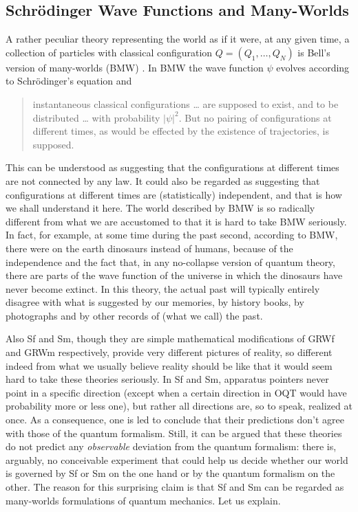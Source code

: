 \documentclass[12pt]{article}
\begin{document}
\subsection{Schr\"odinger Wave Functions  and Many-Worlds}
\label{subsec:swamw}

A rather peculiar theory representing the world as if it were, at any given
 time, a collection of particles with classical configuration
 $Q=(Q_1,\ldots ,Q_N)$ is Bell's version of many-worlds ({\sf BMW})
 \citep{BellMW}. In {\sf BMW} the wave function $\psi$ evolves according to
  Schr\"odinger's equation and \citep{BellMW}
\begin{quote}
   instantaneous classical configurations \ldots{} are 
  supposed to exist, and to be distributed \ldots{}  with probability $|\psi|^2$.
  But no pairing of configurations at different times, as would be 
  effected by the existence of trajectories, is supposed.
\end{quote}
This can be understood as suggesting that the configurations at different times are not connected by any law. It could also be regarded as suggesting that configurations at different times are (statistically) independent, and that is how we shall understand it here.  
The world described by {\sf BMW} is so radically different from what we are accustomed to that it is hard to take {\sf BMW} seriously. In fact, for example, at some time during the past second, according to {\sf BMW}, there were on the earth dinosaurs instead of humans, because of the independence and the fact that, in any no-collapse version of quantum theory, there are parts of the wave function of the universe in which the dinosaurs have never become extinct. In this theory, the actual past will typically entirely disagree with what is suggested by our memories, by history books, by photographs and by other records of (what we call) the past. 

Also {\sf Sf} and {\sf Sm}, though they are  simple mathematical modifications of {\sf GRWf} and {\sf GRWm} respectively,  provide very different pictures of reality, so different indeed from 
 what we usually believe reality should be  like that it would seem hard to take these theories seriously. In {\sf Sf} and {\sf Sm}, apparatus pointers never  
point in a specific direction (except when a certain direction in {\sf OQT} would  
have probability more or less one), but rather all directions are, so to speak, realized at once.  As a consequence, one is led to conclude that their predictions don't agree with those of the quantum formalism. 
Still, it can be argued that these theories do not predict any \emph{observable} deviation from the quantum  
formalism: there is, arguably, no conceivable experiment that could  
help us decide whether our world is governed by {\sf Sf} or {\sf Sm} on the one hand or by the quantum formalism on the other. The reason for this surprising claim is that {\sf Sf} and {\sf Sm} can be regarded as many-worlds formulations of quantum mechanics. Let us explain. 
\end{document}
